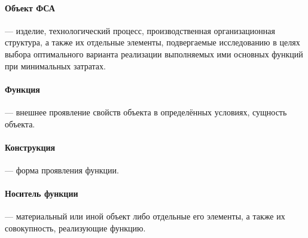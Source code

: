 \paragraph{Объект ФСА} --- изделие, технологический процесс, производственная
организационная структура, а также их отдельные элементы, подвергаемые
исследованию в целях выбора оптимального варианта реализации выполняемых ими
основных функций при минимальных затратах.

\paragraph{Функция} --- внешнее проявление свойств объекта в определённых
условиях, сущность объекта.

\paragraph{Конструкция} --- форма проявления функции.

\paragraph{Носитель функции} --- материальный или иной объект либо отдельные
его элементы, а также их совокупность, реализующие функцию.

